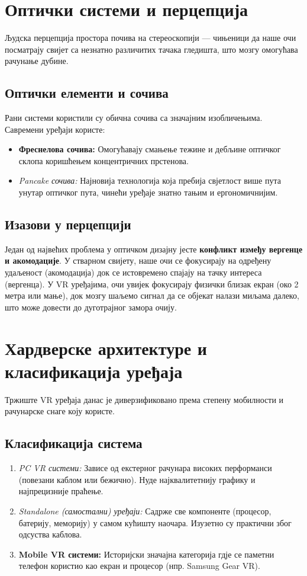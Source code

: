 \documentclass[12pt,a4paper]{article}
\begin{document}
\section{Оптички системи и перцепција}

Људска перцепција простора почива на стереоскопији — чињеници да наше очи посматрају свијет са незнатно различитих тачака гледишта, што мозгу омогућава рачунање дубине.

\subsection{Оптички елементи и сочива}
Рани системи користили су обична сочива са значајним изобличењима. Савремени уређаји користе:
\begin{itemize}
    \item \textbf{Фреснелова сочива:} Омогућавају смањење тежине и дебљине оптичког склопа коришћењем концентричних прстенова.
    \item \textit{Pancake сочива:} Најновија технологија која пребија свјетлост више пута унутар оптичког пута, чинећи уређаје знатно тањим и ергономичнијим.
\end{itemize}

\subsection{Изазови у перцепцији}
Један од највећих проблема у оптичком дизајну јесте \textbf{конфликт између вергенце и акомодације}. У стварном свијету, наше очи се фокусирају на одређену удаљеност (акомодација) док се истовремено спајају на тачку интереса (вергенца). У VR уређајима, очи увијек фокусирају физички близак екран (око 2 метра или мање), док мозгу шаљемо сигнал да се објекат налази миљама далеко, што може довести до дуготрајног замора очију.

\section{Хардверске архитектуре и класификација уређаја}

Тржиште VR уређаја данас је диверзификовано према степену мобилности и рачунарске снаге коју користе.

\subsection{Класификација система}
\begin{enumerate}
    \item \textit{PC VR системи:} Зависе од екстерног рачунара високих перформанси (повезани каблом или бежично). Нуде најквалитетнију графику и најпрецизније праћење.
    \item \textit{Standalone (самостални) уређаји:} Садрже све компоненте (процесор, батерију, меморију) у самом кућишту наочара. Изузетно су практични због одсуства каблова.
    \item \textbf{Mobile VR системи:} Историјски значајна категорија гдје се паметни телефон користио као екран и процесор (нпр. Samsung Gear VR).
\end{enumerate}
\end{document}
